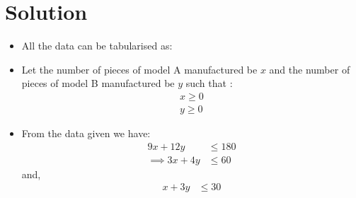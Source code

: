 \documentclass[journal,12pt,twocolumn]{IEEEtran}
\begin{document}
\section{Solution}
\begin{itemize}
\item All the data can be tabularised as:
\begin{table}[!ht]
\centering
{}
\caption{Labour Hours and Profit for each piece}
\label{tab:table1}
\end{table}
\item Let the number of pieces of model A manufactured be $x$ and
the number of pieces of model B manufactured be $y$ such that : 
\begin{align}
    x \geq 0 
    \\
    y \geq 0 
\end{align}
\item From the data given we have:
\begin{align}
    9x+12y &\leq 180 \\
    \implies 3x+4y&\leq60
\end{align}
and,
\begin{align}
    x+3y &\leq 30 
\end{align}


\end{itemize}
\end{document}
